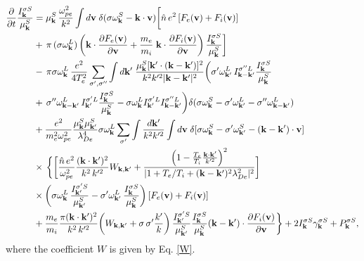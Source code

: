 \documentclass[12pt,a4paper,ruledheader]{report}
\begin{document}
\begin{equation}
  \label{S-gen}
  \begin{split}
\frac{\partial}{\partial t}\frac{I_{\bf k}^{\sigma S}}{\mu_{\bf k}^S}
&=\mu_{\bf k}^S\,\frac{\omega_{pe}^2}{k^2}
\int d{\bf v}\;\delta(\sigma\omega_{\bf k}^S-{\bf k}\cdot{\bf v})
\biggl[\hat{n}\,e^2\,[F_e({\bf v})+F_i({\bf v})]\\
&+\,\pi\,(\sigma\omega_{\bf k}^L)\,\biggl({\bf k}\cdot
\frac{\partial F_e({\bf v})}{\partial{\bf v}}
+\frac{m_e}{m_i}\;{\bf k}\cdot
\frac{\partial F_i({\bf v})}{\partial{\bf v}}\biggr)
\,\frac{I_{\bf k}^{\sigma S}}{\mu_{\bf k}^S}\biggr]\\
&-\,\pi\sigma\omega_{\bf k}^L\,\frac{e^2}{4T_e^2}
\sum_{\sigma ',\sigma ''}\int d{\bf k'}\;
\frac{\mu_{\bf k}^S[{\bf k}'\cdot({\bf k}-{\bf k}')]^2}{k^2k'^2|{\bf k}-{\bf k}'|^2}
\biggl(\sigma '\omega_{{\bf k}'}^L\,
I_{{\bf k}-{\bf k}'}^{\sigma ''L}
\frac{I_{\bf k}^{\sigma S}}{\mu_{\bf k}^S}\\
&+\,\sigma ''\omega_{{\bf k}-{\bf k}'}^L
\,I_{{\bf k}'}^{\sigma 'L}\frac{I_{\bf k}^{\sigma S}}{\mu_{\bf k}^S}
-\sigma\omega_{\bf k}^LI_{{\bf k}'}^{\sigma 'L}
I_{{\bf k}-{\bf k}'}^{\sigma ''L}\biggr)
\delta(\sigma\omega_{\bf k}^S-\sigma '\omega_{{\bf k}'}^L
-\sigma ''\omega_{{\bf k}-{\bf k}'}^L)\\
&+\frac{e^2}{m_e^2\omega_{pe}^2}\frac{\mu_{\bf k}^S\mu_{{\bf k}'}^S}{\lambda_{De}^4}
\sigma\omega_{\bf k}^L\sum_{\sigma '}\int \frac{d{\bf k'}}{k^2k'^2}\int d{\bf v}\;
\delta[\sigma\omega_{\bf k}^S-\sigma '\omega_{{\bf k}'}^S
-({\bf k}-{\bf k}')\cdot{\bf v}]\\
&\times\,\biggl\{\biggl[\frac{\hat{n}\,e^2}{\omega_{pe}^2}
\frac{({\bf k}\cdot{\bf k}')^2}{k^2\,k'^2}W_{{\bf k},{\bf k}'}
+\frac{\left(1-\frac{T_e}{T_i} \frac{\bf k \cdot k'}{k'^2}\right)^2}
{|1+T_e/T_i+({\bf k-k'})^2 \lambda_{De}^2|^2}\biggr]\\
&\times\biggl(\sigma\omega_{\bf k}^L\,
\frac{I_{{\bf k}'}^{\sigma 'S}}{\mu_{{\bf k}'}^S}
-\sigma '\omega_{{\bf k}'}^L\,
\frac{I_{\bf k}^{\sigma S}}{\mu_{\bf k}^S}\biggr)
\,[F_e({\bf v})+F_i({\bf v})]\\
&+\frac{m_e}{m_i}\frac{\pi({\bf k}\cdot{\bf k}')^2}{k^2\,k'^2}
\biggl(W_{{\bf k},{\bf k}'}+\sigma\,\sigma '\frac{k'}{k}\biggr)
\,\frac{I_{{\bf k}'}^{\sigma 'S}}{\mu_{{\bf k}'}^S}
\frac{I_{\bf k}^{\sigma S}}{\mu_{\bf k}^S}({\bf k}-{\bf k}')
\cdot\frac{\partial F_i({\bf v})}{\partial{\bf v}}\biggr\}
+2 I_{\bf k}^{\sigma S} \gamma_{\bf k}^{\sigma S}+ P_{\bf k}^{\sigma S},
\end{split}
\end{equation}
where the coefficient $W$ is given by Eq. \eqref{W}.
\end{document}

